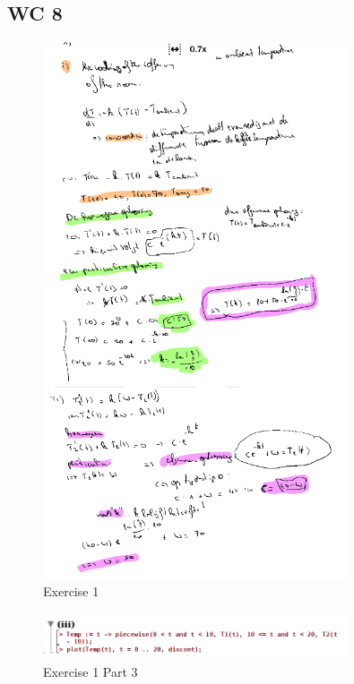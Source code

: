 \documentclass[a4paper]{report}
\begin{document}


\subsection*{WC 8}

\begin{figure}[H]
	\centering
	\includegraphics[width=0.8\textwidth]{assets/wc_8_ex_1.png}
	\caption{Exercise 1}
	\label{fig:wc_8_ex_1}
\end{figure}

\begin{figure}[H]
	\centering
	\includegraphics[width=0.8\textwidth]{assets/wc_8_ex_1_part_3.png}
	\caption{Exercise 1 Part 3}
	\label{fig:wc_8_ex_1_part_3}
\end{figure}






\end{document}
